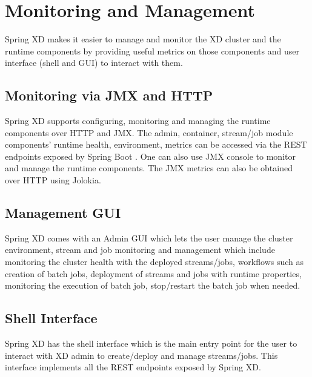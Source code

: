 \section {Monitoring and Management}
 Spring XD makes it easier to manage and monitor the XD cluster and the
runtime components by providing useful metrics on those components and
user interface (shell and GUI) to interact with them.

\subsection {Monitoring via JMX and HTTP}
Spring XD supports configuring, monitoring and managing the runtime components
over HTTP and JMX. The admin, container, stream/job module components' runtime health,
environment, metrics can be accessed via the REST endpoints exposed by 
Spring Boot \cite{spring-boot}. One can also use JMX console to monitor and manage
the runtime components. The JMX metrics can also be obtained over HTTP using Jolokia.

\subsection {Management GUI}
Spring XD comes with an Admin GUI which lets the user manage the cluster environment,
stream and job monitoring and management which include monitoring the cluster health
with the deployed streams/jobs, workflows such as creation of batch jobs,
deployment of streams and jobs with runtime properties, monitoring the execution
of batch job, stop/restart the batch job when needed.

\subsection {Shell Interface}
Spring XD has the shell interface which is the main entry point for the user
to interact with XD admin to create/deploy and manage streams/jobs. This
interface implements all the REST endpoints exposed by Spring XD.

